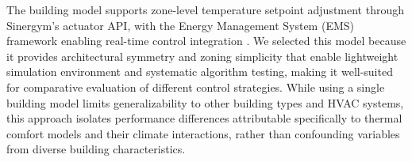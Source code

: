 The building model supports zone-level temperature setpoint adjustment through Sinergym's actuator API, with the Energy Management System (EMS) framework enabling real-time control integration \cite{campoy2025sinergym}. We selected this model because it provides architectural symmetry and zoning simplicity that enable lightweight simulation environment and systematic algorithm testing, making it well-suited for comparative evaluation of different control strategies. While using a single building model limits generalizability to other building types and HVAC systems, this approach isolates performance differences attributable specifically to thermal comfort models and their climate interactions, rather than confounding variables from diverse building characteristics.




